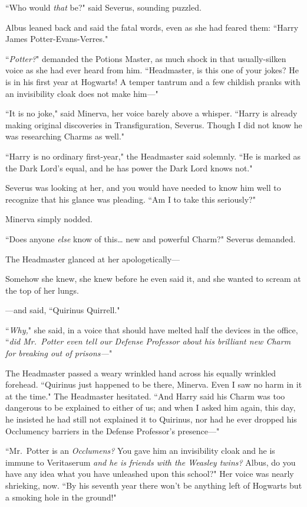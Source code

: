 ``Who would \emph{that} be?" said Severus, sounding puzzled.

Albus leaned back and said the fatal words, even as she had feared them: ``Harry James Potter-Evans-Verres."

``\emph{Potter?}" demanded the Potions Master, as much shock in that usually-silken voice as she had ever heard from him. ``Headmaster, is this one of your jokes? He is in his first year at Hogwarts! A temper tantrum and a few childish pranks with an invisibility cloak does not make him—"

``It is no joke," said Minerva, her voice barely above a whisper. ``Harry is already making original discoveries in Transfiguration, Severus. Though I did not know he was researching Charms as well."

``Harry is no ordinary first-year," the Headmaster said solemnly. ``He is marked as the Dark Lord's equal, and he has power the Dark Lord knows not."

Severus was looking at her, and you would have needed to know him well to recognize that his glance was pleading. ``Am I to take this seriously?"

Minerva simply nodded.

``Does anyone \emph{else} know of this{\ldots} new and powerful Charm?" Severus demanded.

The Headmaster glanced at her apologetically—

Somehow she knew, she knew before he even said it, and she wanted to scream at the top of her lungs.

—and said, ``Quirinus Quirrell."

``\emph{Why,}" she said, in a voice that should have melted half the devices in the office, ``\emph{did Mr.~Potter even \emph{tell} our Defense Professor about his brilliant new Charm for breaking out of prisons—}"

The Headmaster passed a weary wrinkled hand across his equally wrinkled forehead. ``Quirinus just happened to be there, Minerva. Even I saw no harm in it at the time." The Headmaster hesitated. ``And Harry said his Charm was too dangerous to be explained to either of us; and when I asked him again, this day, he insisted he had still not explained it to Quirinus, nor had he ever dropped his Occlumency barriers in the Defense Professor's presence—"

``Mr.~Potter is an \emph{Occlumens?} You gave him an invisibility cloak and he is immune to Veritaserum \emph{and he is friends with the Weasley twins?} Albus, do you have any idea what you have unleashed upon this school?" Her voice was nearly shrieking, now. ``By his seventh year there won't be anything left of Hogwarts but a smoking hole in the ground!"

